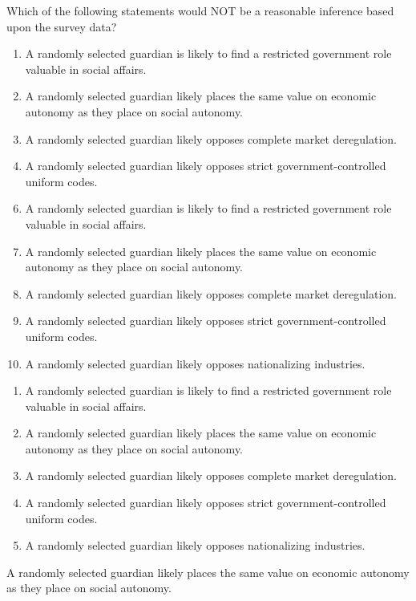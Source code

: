  
Which of the following statements would NOT be a reasonable inference based upon the survey data?


\ifsat
	\begin{enumerate}[label=\Alph*)]
		\item A randomly selected guardian is likely to find a restricted government role valuable in social affairs.
		\item A randomly selected guardian likely places the same value on economic autonomy as they place on social autonomy. %
		\item A randomly selected guardian likely opposes complete market deregulation.
		\item A randomly selected guardian likely opposes strict government-controlled uniform codes.
	\end{enumerate}
\else
\fi

\ifacteven
	\begin{enumerate}[label=\textbf{\Alph*.},itemsep=\fill,align=left]
		\setcounter{enumii}{5}
		\item A randomly selected guardian is likely to find a restricted government role valuable in social affairs.
		\item A randomly selected guardian likely places the same value on economic autonomy as they place on social autonomy. %
		\item A randomly selected guardian likely opposes complete market deregulation.
		\addtocounter{enumii}{1}
		\item A randomly selected guardian likely opposes strict government-controlled uniform codes.
		\item A randomly selected guardian likely opposes nationalizing industries.
	\end{enumerate}
\else
\fi

\ifactodd
	\begin{enumerate}[label=\textbf{\Alph*.},itemsep=\fill,align=left]
		\item A randomly selected guardian is likely to find a restricted government role valuable in social affairs.
		\item A randomly selected guardian likely places the same value on economic autonomy as they place on social autonomy. %
		\item A randomly selected guardian likely opposes complete market deregulation.
		\item A randomly selected guardian likely opposes strict government-controlled uniform codes.
		\item A randomly selected guardian likely opposes nationalizing industries.
	\end{enumerate}
\else
\fi

\ifgridin
 A randomly selected guardian likely places the same value on economic autonomy as they place on social autonomy. %
		
\else
\fi


